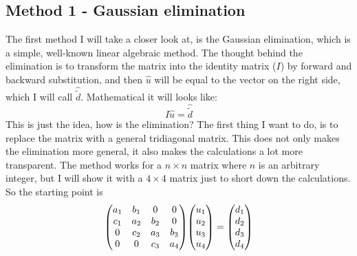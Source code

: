 \documentclass{scrartcl}
\begin{document}
\subsection{Method 1 - Gaussian elimination}
The first method I will take a closer look at, is the Gaussian elimination, which is a simple, well-known linear algebraic method. The thought behind the elimination is to transform the matrix into the identity matrix ($I$) by forward and backward substitution, and then $\hat{u}$ will be equal to the vector on the right side, which I will call $\hat{\tilde{d}}$. Mathematical it will looks like:
$$I\hat{u}=\hat{\tilde{d}}$$
This is just the idea, how is the elimination?
The first thing I want to do, is to replace the matrix with a general tridiagonal matrix. This does not only makes the elimination more general, it also makes the calculations a lot more transparent. The method works for a $n\times n$ matrix where $n$ is an arbitrary integer, but I will show it with a $4\times4$ matrix just to short down the calculations. So the starting point is
$$\mqty(a_1&b_1&0&0\\
		c_1&a_2&b_2&0\\
		0&c_2&a_3&b_3\\
		0&0&c_3&a_4)
\mqty(u_1\\u_2\\u_3\\u_4)=\mqty(d_1\\d_2\\d_3\\d_4)$$
\end{document}
